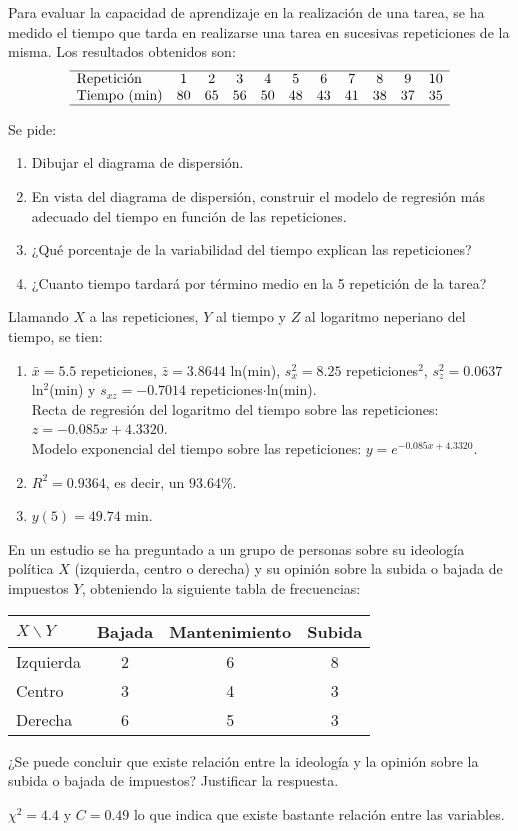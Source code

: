 {Para evaluar la capacidad de aprendizaje en la realización de una tarea, se ha medido el tiempo que tarda en
realizarse una tarea en sucesivas repeticiones de la misma. Los resultados obtenidos son:
\[
\begin{array}{lcccccccccc}
\hline
\mbox{Repetición} & 1 & 2 & 3 & 4 & 5 & 6 & 7 & 8 & 9 & 10\\
\mbox{Tiempo (min)} & 80 & 65 & 56 & 50 & 48 & 43 & 41 & 38 & 37 & 35 \\
\hline
\end{array}
\]

Se pide:
\begin{enumerate}
\item Dibujar el diagrama de dispersión.
\item En vista del diagrama de dispersión, construir el modelo de regresión más adecuado del tiempo en función de las
repeticiones.
\item ¿Qué porcentaje de la variabilidad del tiempo explican las repeticiones?
\item ¿Cuanto tiempo tardará por término medio en la 5 repetición de la tarea?
\end{enumerate}
}
{Llamando $X$ a las repeticiones, $Y$ al tiempo y $Z$ al logaritmo neperiano del tiempo, se tien:
\begin{enumerate}[start=2]
\item $\bar x=5.5$ repeticiones, $\bar z= 3.8644$ ln(min), $s_x^2=8.25$ repeticiones$^2$, $s_z^2=0.0637$ ln$^2$(min) y
$s_{xz}=-0.7014$ repeticiones$\cdot$ln(min).\\
Recta de regresión del logaritmo del tiempo sobre las repeticiones: $z=-0.085x+4.3320$.\\
Modelo exponencial del tiempo sobre las repeticiones: $y=e^{-0.085x+4.3320}$.
\item $R^2=0.9364$, es decir, un $93.64\%$.
\item $y(5)=49.74$ min.
\end{enumerate}
}
{}


{En un estudio se ha preguntado a un grupo de personas sobre su ideología política $X$ (izquierda, centro o derecha) y
su opinión sobre la subida o bajada de impuestos $Y$, obteniendo la siguiente tabla de frecuencias:
\begin{center}
\begin{tabular}{|l|c|c|c|}
\hline
$X\backslash Y$ & Bajada & Mantenimiento & Subida \\
\hline
Izquierda & 2 & 6 & 8 \\
\hline
Centro & 3 & 4 & 3 \\
\hline
Derecha & 6 & 5 & 3 \\
\hline
\end{tabular}
\end{center}
¿Se puede concluir que existe relación entre la ideología y la opinión sobre la subida o bajada de impuestos?
Justificar la respuesta.
}
{$\chi^2=4.4$ y $C=0.49$ lo que indica que existe bastante relación entre las variables.}
{}


